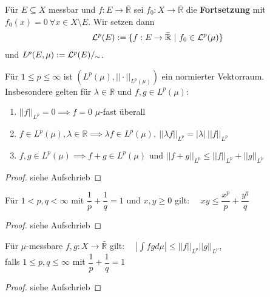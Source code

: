   \begin{definition}
    Für $E \subseteq X$ messbar und $f: E \to \bar{\mathbb{R}}$ sei $f_0: X\to \bar{\mathbb{R}}$ die \textbf{Fortsetzung} mit $f_0(x)=0 \ \forall x \in X \setminus E$. Wir setzen dann
    \begin{align*}
      \mathcal{L}^p(E) := \{f:E \to \bar{\mathbb{R}} \ | \ f_0 \in \mathcal{L}^p(\mu)\}
    \end{align*}
    und $L^p(E,\mu) := \mathcal{L}^p(E)/_{\sim}$.
  \end{definition}

  \begin{proposition}
    Für $1 \leq p \leq \infty$ ist $(L^p(\mu), ||\cdot||_{L^p(\mu)})$ ein normierter Vektorraum. Insbesondere gelten für $\lambda \in \mathbb{R}$ und $f,g \in L^p(\mu)$:
    \begin{enumerate}
      \item $||f||_{L^p} = 0 \implies f = 0$ $\mu$-fast überall
      \item $f \in L^p(\mu), \lambda \in \mathbb{R} \implies \lambda f \in L^p(\mu), \ ||\lambda f||_{L^p} = |\lambda| \ ||f||_{L^p}$
      \item $f,g \in L^p(\mu) \implies f+g \in L^p(\mu)$ und $||f+g||_{L^p} \leq ||f||_{L^p} + ||g||_{L^p}$
    \end{enumerate}
  \end{proposition}

  \begin{proof}
    siehe Aufschrieb
  \end{proof}

  \begin{lemma}
    Für $1 < p,q < \infty$ mit $\dfrac{1}{p} + \dfrac{1}{q} = 1$ und $x,y \geq 0$ gilt: \ \ $xy \leq \dfrac{x^p}{p} + \dfrac{y^q}{q}$
  \end{lemma}

  \begin{proof}
    siehe Aufschrieb
  \end{proof}

  \newpage
  \begin{theorem}
    Für $\mu$-messbare $f,g: X \to \bar{\mathbb{R}}$ gilt: \ \ $|\int fg d\mu| \leq ||f||_{L^p} ||g||_{L^p}$,\\
    falls $1 \leq p,q \leq \infty$ mit $\dfrac{1}{p} + \dfrac{1}{q} = 1$
  \end{theorem}

  \begin{proof}
    siehe Aufschrieb
  \end{proof}

